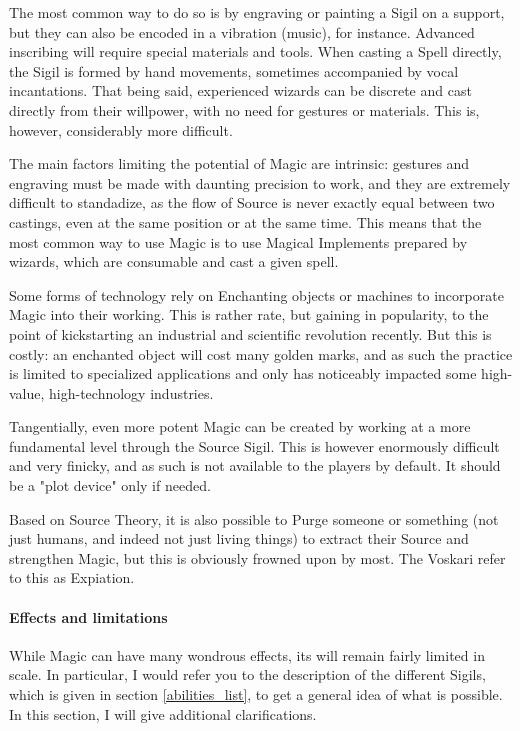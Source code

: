 The most common way to do so is by engraving or painting a Sigil on a support, but they can also be encoded in a vibration (music), for instance. Advanced inscribing will require special materials and tools. When casting a Spell directly, the Sigil is formed by hand movements, sometimes accompanied by vocal incantations. That being said, experienced wizards can be discrete and cast directly from their willpower, with no need for gestures or materials. This is, however, considerably more difficult. 

The main factors limiting the potential of Magic are intrinsic: gestures and engraving must be made with daunting precision to work, and they are extremely difficult to standadize, as the flow of Source is never exactly equal between two castings, even at the same position or at the same time. This means that the most common way to use Magic is to use Magical Implements prepared by wizards, which are consumable and cast a given spell.

Some forms of technology rely on Enchanting objects or machines to incorporate Magic into their working. This is rather rate, but gaining in popularity, to the point of kickstarting an industrial and scientific revolution recently. But this is costly: an enchanted object will cost many golden marks, and as such the practice is limited to specialized applications and only has noticeably impacted some high-value, high-technology industries.

Tangentially, even more potent Magic can be created by working at a more fundamental level through the Source Sigil. This is however enormously difficult and very finicky, and as such is not available to the players by default. It should be a "plot device" only if needed.

Based on Source Theory, it is also possible to Purge someone or something (not just humans, and indeed not just living things) to extract their Source and strengthen Magic, but this is obviously frowned upon by most. The Voskari refer to this as Expiation.


\paragraph{Effects and limitations}

\label{magic_effects}

While Magic can have many wondrous effects, its will remain fairly limited in scale. In particular, I would refer you to the description of the different Sigils, which is given in section \ref{abilities_list}, to get a general idea of what is possible. In this section, I will give additional clarifications.

